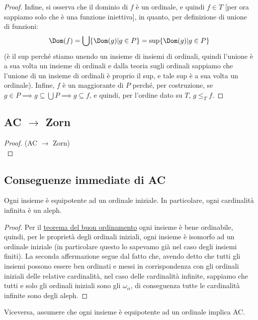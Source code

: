 \documentclass[11pt]{scrartcl}
\begin{document}
\begin{proof}
	Infine, si osserva che il dominio di $f$ è un ordinale, e quindi $f \in T$ [per ora sappiamo solo che è una funzione iniettiva], in quanto, per definizione di unione di funzioni:
	\[ \Dom(f) = \bigcup\{\Dom(g) | g \in P\} = \sup\{\Dom(g) | g \in P\}
		\]
	(è il sup perché stiamo unendo un insieme di insiemi di ordinali, quindi l'unione è a sua volta un insieme di ordinali e dalla teoria sugli ordinali sappiamo che l'unione di un insieme di ordinali è proprio il sup, e tale sup è a sua volta un ordinale). Infine, $f$ è un maggiorante di $P$ perché, per costruzione, se $g \in P \implies g \subseteq \bigcup P \implies g \subseteq f$, e quindi, per l'ordine dato su $T$, $g \leq_T f$.
\end{proof}

\subsection{\texorpdfstring{AC $\rightarrow$ Zorn}{AC implica Zorn}}

\begin{proof}
	(AC $\rightarrow$ Zorn)\\
\end{proof}

\subsection{Conseguenze immediate di AC}

\begin{proposition}
	Ogni insieme è equipotente ad un ordinale iniziale. In particolare, ogni cardinalità infinita è un aleph.
\end{proposition}

\begin{proof}
	Per il \hyperref[buon_ordinamento]{teorema del buon ordinamento} ogni insieme è bene ordinabile, quindi, per le proprietà
	degli ordinali iniziali, ogni insieme è isomorfo ad un ordinale iniziale (in particolare questo lo sapevamo già nel caso degli insiemi finiti).
	La seconda affermazione segue dal fatto che, avendo detto che tutti gli insiemi possono essere ben ordinati e messi in corrispondenza con gli
	ordinali iniziali delle relative cardinalità, nel caso delle cardinalità infinite, sappiamo che tutti e solo gli ordinali iniziali sono gli $\omega_\alpha$,
	di conseguenza tutte le cardinalità infinite sono degli aleph.
\end{proof}

\begin{remark}
	Viceversa, assumere che ogni insieme è equipotente ad un ordinale implica AC.
\end{remark}
\end{document}
